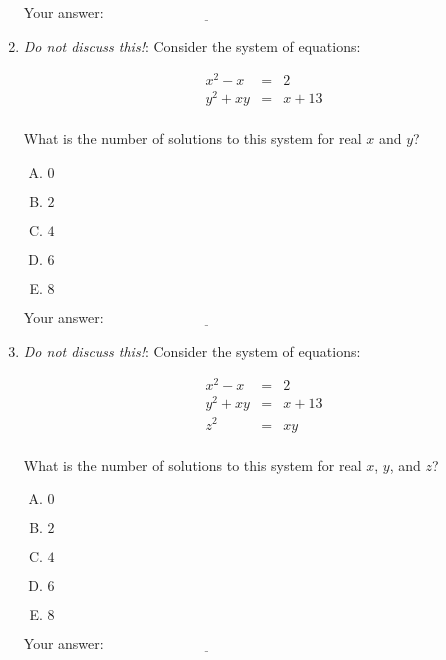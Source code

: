 \documentclass[10pt]{amsart}
\begin{document}
\begin{enumerate}
  \vspace{0.1in}
  Your answer: $\underline{\qquad\qquad\qquad\qquad\qquad\qquad\qquad}$
  \vspace{0.6in}

\item {\em Do not discuss this!}: Consider the system of equations:

  \begin{eqnarray*}
    x^2 - x & = & 2 \\
    y^2 + xy & = & x + 13 \\
  \end{eqnarray*}

  What is the number of solutions to this system for real $x$ and $y$?

  \begin{enumerate}[(A)]
  \item $0$
  \item $2$
  \item $4$
  \item $6$
  \item $8$
  \end{enumerate}

  \vspace{0.1in}
  Your answer: $\underline{\qquad\qquad\qquad\qquad\qquad\qquad\qquad}$
  \vspace{0.6in}

\item {\em Do not discuss this!}: Consider the system of equations:

  \begin{eqnarray*}
    x^2 - x & = & 2 \\
    y^2 + xy & = & x + 13 \\
    z^2 & = & xy \\
  \end{eqnarray*}

  What is the number of solutions to this system for real $x$, $y$,
  and $z$?

  \begin{enumerate}[(A)]
  \item $0$
  \item $2$
  \item $4$
  \item $6$
  \item $8$
  \end{enumerate}

  \vspace{0.1in}
  Your answer: $\underline{\qquad\qquad\qquad\qquad\qquad\qquad\qquad}$
  \vspace{0.6in}


\end{enumerate}
\end{document}
